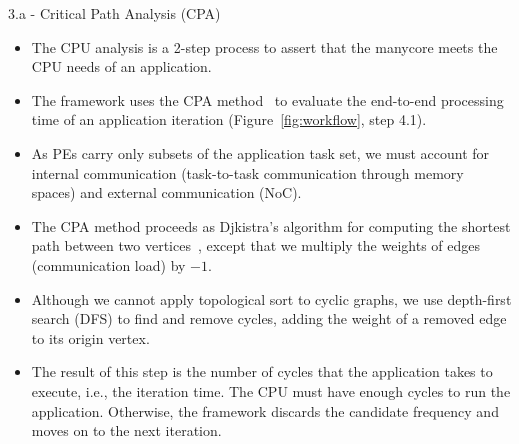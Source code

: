 \begin{frame}{3.a - Critical Path Analysis (CPA)}
	
	\begin{itemize}
		\item The CPU analysis is a 2-step process to assert that the manycore meets the CPU needs of an application. 
		
		\item The framework uses the CPA method~\cite{Kelley:1959} to evaluate the end-to-end processing time of an application iteration (Figure~\ref{fig:workflow}, step 4.1). 
		
		\item As PEs carry only subsets of the application task set, we must account for internal communication (task-to-task communication through memory spaces) and external communication (NoC). 
		
		\item The CPA method proceeds as Djkistra’s algorithm for computing the shortest path between two vertices~\cite{dijkstra:1959}, except that we multiply the weights of edges (communication load) by $-1$. 
		
		\item Although we cannot apply topological sort to cyclic graphs, we use depth-first search (DFS) to find and remove cycles, adding the weight of a removed edge to its origin vertex. 
		
		\item The result of this step is the number of cycles that the application takes to execute, i.e., the iteration time. The CPU must have enough cycles to run the application. Otherwise, the framework discards the candidate frequency and moves on to the next iteration.%
	\end{itemize}
\end{frame}


